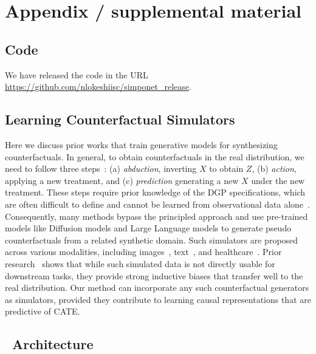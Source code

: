 \clearpage
\section{Appendix / supplemental material}
% 

\subsection{Code}
\label{app:code}
We have released the code in the URL \url{https://github.com/nlokeshiisc/simponet_release}. 

\subsection{Learning Counterfactual Simulators}
\label{app:cf_gen}
Here we discuss prior works that train generative models for synthesizing counterfactuals.  In general, to obtain counterfactuals in the real distribution, we need to follow three steps~\citep{deepSCM}: (a) \textit{abduction}, inverting $X$ to obtain $Z$, (b) \textit{action}, applying a new treatment, and (c) \textit{prediction} generating a new $X$ under the new treatment. These steps require prior knowledge of the DGP specifications, which are often difficult to define and cannot be learned from observational data alone~\citep{deepSCM}. Consequently, many methods bypass the principled approach and use pre-trained models like Diffusion models and Large Language models to generate pseudo counterfactuals from a related synthetic domain. Such simulators are proposed across various modalities, including images~\citep{deepSCM, cf_img_1, cf_img_2, cf_img_3, cf_img_4, cf_img_5}, text~\citep{cf_text_1, cf_text_2, cf_text_3, cf_text_4, cf_text_5}, and healthcare~\citep{cf_health_1, cf_health_2, cf_health_3}. 
Prior research~\citep{sim_real_inducbias} shows that while such simulated data is not directly usable for downstream tasks, they provide strong inductive biases that transfer well to the real distribution. Our method can incorporate any such counterfactual generators as simulators, provided they contribute to learning causal representations that are predictive of CATE.

% 



\subsection{\our\ Architecture}

